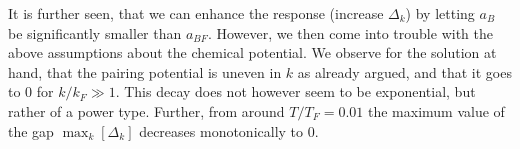 It is further seen, that we can enhance the response (increase $\Delta_k$) by letting $a_B$ be significantly smaller than $a_{BF}$. However, we then come into trouble with the above assumptions about the chemical potential. We observe for the solution at hand, that the pairing potential is uneven in $k$ as already argued, and that it goes to 0 for $k/k_F \gg 1$. This decay does not however seem to be exponential, but rather of a power type. Further, from around $T/T_F = 0.01$ the maximum value of the gap $\max_k[\Delta_k]$ decreases monotonically to 0. 